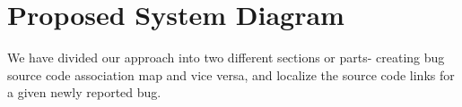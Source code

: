 \documentclass{sig-alternate}
\begin{document}
\section{Proposed System Diagram}\label{sec:proposedsystemDiagram}
We have divided our approach into two different sections or parts- creating bug source code association map and vice versa, and localize the source code links for a given newly reported bug.
%
%
%
 
\end{document}
